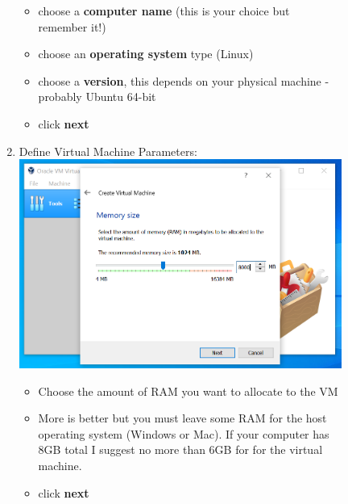 \documentclass[12pt]{article}
\begin{document}
\begin{description}
\begin{description}
\begin{enumerate}[label=\alph*)]
\begin{itemize}
                \item choose a {\bf computer name} (this is your choice but remember it!)
                \item choose an {\bf operating system} type (Linux)
                \item choose a {\bf version}, this depends on your physical machine - probably Ubuntu 64-bit 
                \item click {\bf next}
                
            \end{itemize}
\vspace{10mm}
\item Define Virtual Machine Parameters: \vspace{5mm} \\
      		\hspace*{-2.5cm}\includegraphics[scale=.55]{Capture5.png}\\
            \begin{itemize}
                
                \item Choose the amount of RAM you want to allocate to the VM  
                \item More is better but you must leave some RAM for the host operating system (Windows or Mac). If your computer has 8GB total I suggest no more than 6GB for for the virtual machine.  
                \item click {\bf next}
                
            \end{itemize}


\end{enumerate}
\end{description}
\end{description}
\end{document}
